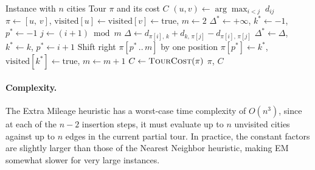 \documentclass{article}
\begin{document}
\begin{algorithm}[H]
\caption{Extra Mileage Heuristic}
\label{alg:em}
\begin{algorithmic}[1]
\Require Instance with $n$ cities
\Ensure Tour $\pi$ and its cost $C$
\State $(u, v) \leftarrow \arg\max_{i < j}\; d_{ij}$
\State $\pi \leftarrow [u,\, v]$, $\text{visited}[u] \leftarrow \text{visited}[v] \leftarrow \text{true}$, $m \leftarrow 2$
    \State $\Delta^* \leftarrow +\infty$, $k^* \leftarrow -1$, $p^* \leftarrow -1$
            \State $j \leftarrow (i + 1) \bmod m$
            \State $\Delta \leftarrow d_{\pi[i],\,k} + d_{k,\,\pi[j]} - d_{\pi[i],\,\pi[j]}$
            \If{$\Delta < \Delta^*$}
                \State $\Delta^* \leftarrow \Delta$, $k^* \leftarrow k$, $p^* \leftarrow i + 1$
            \EndIf
        \EndFor
    \EndFor
    \State Shift right $\pi[p^*\,..\,m]$ by one position 
    \State $\pi[p^*] \leftarrow k^*$, $\text{visited}[k^*] \leftarrow \text{true}$, $m \leftarrow m + 1$
\EndWhile
\State $C \leftarrow \textsc{TourCost}(\pi)$
\State \Return $\pi$, $C$
\end{algorithmic}
\end{algorithm}

\paragraph{Complexity.}
The Extra Mileage heuristic has a worst-case time complexity of $O(n^3)$, since at each of
the $n-2$ insertion steps, it must evaluate up to $n$ unvisited cities against up to $n$
edges in the current partial tour. In practice, the constant factors are slightly larger than
those of the Nearest Neighbor heuristic, making EM somewhat slower for very large instances.


\end{document}
